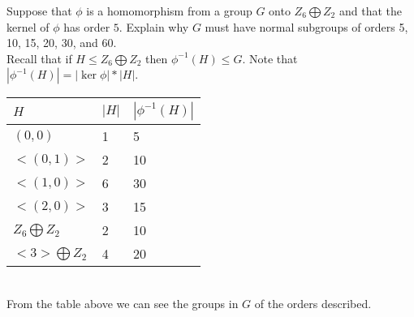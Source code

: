 \documentclass[12pt]{article}
\makeatletter
\theoremstyle{homework}
\newenvironment{exercise}[1]
{\def\@currentlabel{#1}\exercisecore}
{\endexercisecore}
\makeatother
\begin{document}
\begin{exercise}{10.30}
Suppose that $\phi$ is a homomorphism from a group $G$ onto $Z_6 \bigoplus Z_2$ and that the kernel of $\phi$ has order $5$. Explain why $G$ must have normal subgroups of orders 5, 10, 15, 20, 30, and 60.\\
Recall that if $H\leq Z_6 \bigoplus Z_2$ then $\phi^{-1}(H)\leq G$.  Note that $|\phi^{-1}(H)|=|\ker\phi|*|H|$.\\
\begin{tabular}{|l|l|l|}
\hline
$H$ & $|H|$ & $|\phi^{-1}(H)|$\\
\hline
$(0,0)$ & 1 & 5\\
\hline
$<(0,1)>$ & 2 & 10\\
\hline
$<(1,0)>$ & 6 & 30\\
\hline
$<(2,0)>$ & 3 & 15\\
\hline
$Z_6\bigoplus Z_2$ & 2 & 10\\
\hline
$<3>\bigoplus Z_2$ & 4 & 20\\
\hline
\end{tabular}\\
From the table above we can see the groups in $G$ of the orders described.
\end{exercise}
\end{document}
